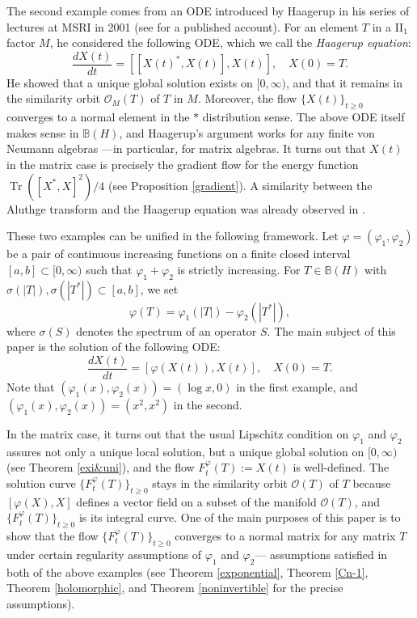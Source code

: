 \documentclass[12pt]{article}
\theoremstyle{definition}
\numberwithin{equation}{section}
\newcommand{\B}{\mathbb{B}}
\newcommand{\cO}{\mathcal{O}} \newcommand{\cP}{\mathcal{P}}
\DeclareMathOperator{\Tr}{Tr}
\begin{document}
The second example comes from an ODE introduced by Haagerup in his series of lectures 
at MSRI in 2001 (see \cite[Section 2]{HS2009} for a published account).  
For an element $T$ in a II$_1$ factor $M$, he considered the following ODE, which we call 
the \textit{Haagerup equation}:   
\begin{equation}\label{HaagerupODE}
\frac{dX(t)}{dt}=[[X(t)^*,X(t)],X(t)],\quad X(0)=T.
\end{equation}
He showed that  a unique global solution exists on $[0,\infty)$, and that it remains in the similarity orbit 
$\cO_M(T)$ of $T$ in $M$. 
Moreover, the flow $\{X(t)\}_{t\geq 0}$ converges to a normal element in the $*$ distribution sense. 
The above ODE itself makes sense in $\B(H)$, and Haagerup's argument works for any finite von Neumann algebras
---in particular, for matrix algebras. 
It turns out that $X(t)$ in the matrix case is precisely the gradient flow for 
the energy function $\Tr([X^*,X]^2)/4$ (see Proposition \ref{gradient}). 
A similarity between the Aluthge transform and the Haagerup equation was 
already observed in \cite{DS2009}. 
	

These two examples can be unified in the following framework. 
Let $\varphi=(\varphi_1,\varphi_2)$ be a pair of continuous increasing functions on a finite closed 
interval $[a,b]\subset [0,\infty)$ such that $\varphi_1+\varphi_2$ is strictly increasing. 
For $T\in \B(H)$ with $\sigma(|T|),\sigma(|T^*|)\subset [a,b]$, we set 
\[\varphi(T)=\varphi_1(|T|)-\varphi_2(|T^*|),\] 
where $\sigma(S)$ denotes the spectrum of an operator $S$. 
The main subject of this paper is the solution of the following ODE: 
\begin{equation}\label{ODE}
\frac{dX(t)}{dt}=[\varphi(X(t)),X(t)],\quad X(0)=T.\end{equation}
Note that $(\varphi_1(x),\varphi_2(x))=(\log x,0)$ in the first example, and 
$(\varphi_1(x),\varphi_2(x))=(x^2,x^2)$ in the second.  


In the matrix case, it turns out that the usual Lipschitz condition on $\varphi_1$ and $\varphi_2$ 
assures not only a unique local solution, but a unique global solution on $[0,\infty)$ 
(see Theorem \ref{exi&uni}), and the flow $F^\varphi_t(T):=X(t)$ is well-defined. 
The solution curve $\{F^\varphi_t(T)\}_{t\geq0}$ stays in the similarity orbit $\cO(T)$ of $T$ 
because $[\varphi(X),X]$ defines a vector field on a subset of the manifold $\cO(T)$, and 
$\{F^\varphi_t(T)\}_{t\geq0}$ is its integral curve. 
One of the main purposes of this paper is to show that the flow $\{F^\varphi_t(T)\}_{t\geq 0}$ converges to a normal matrix for 
any matrix $T$ under certain regularity assumptions of $\varphi_1$ and $\varphi_2$---
assumptions satisfied in both of the above examples (see Theorem \ref{exponential}, Theorem \ref{Cn-1}, Theorem \ref{holomorphic}, and 
Theorem \ref{noninvertible} for the precise assumptions).  
\end{document}
